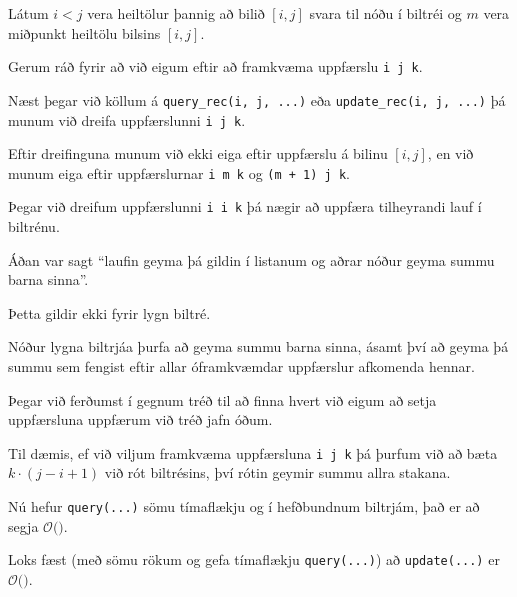 {
	{
		\item<1-> Látum $i < j$ vera heiltölur þannig að bilið $[i, j]$ svara til nóðu í biltréi og $m$ vera miðpunkt heiltölu bilsins $[i, j]$.
		\item<2-> Gerum ráð fyrir að við eigum eftir að framkvæma uppfærslu \texttt{i j k}.
		\item<3-> Næst þegar við köllum á \texttt{query\_rec(i, j, ...)} eða \texttt{update\_rec(i, j, ...)}
					þá munum við dreifa uppfærslunni \texttt{i j k}.
		\item<4-> Eftir dreifinguna munum við ekki eiga eftir uppfærslu á bilinu $[i, j]$, en við munum eiga eftir uppfærslurnar
					\texttt{i m k} og \texttt{(m + 1) j k}.
		\item<5-> Þegar við dreifum uppfærslunni \texttt{i i k} þá nægir að uppfæra tilheyrandi lauf í biltrénu.
	}
}

{
	{
		\item<1-> Áðan var sagt ``laufin geyma þá gildin í listanum og aðrar nóður geyma summu barna sinna''.
		\item<2-> Þetta gildir ekki fyrir lygn biltré.
		\item<3-> Nóður lygna biltrjáa þurfa að geyma summu barna sinna,
					ásamt því að geyma þá summu sem fengist eftir allar óframkvæmdar uppfærslur afkomenda hennar.
		\item<4-> Þegar við ferðumst í gegnum tréð til að finna hvert við eigum að setja uppfærsluna uppfærum við tréð jafn óðum.
		\item<5-> Til dæmis, ef við viljum framkvæma uppfærsluna \texttt{i j k} þá þurfum við að bæta $k \cdot (j - i + 1)$ við rót biltrésins,
					því rótin geymir summu allra stakana.
	}
}

{
}

{
	{
		\item<1-> Nú hefur \texttt{query(...)} sömu tímaflækju og í hefðbundnum biltrjám, það er að segja $\mathcal{O}($\onslide<2->{$\log n$}$)$.
		\item<3-> Loks fæst (með sömu rökum og gefa tímaflækju \texttt{query(...)}) að \texttt{update(...)} er
					$\mathcal{O}($\onslide<4->{$\log n$}$)$.
	}
}

{
}


